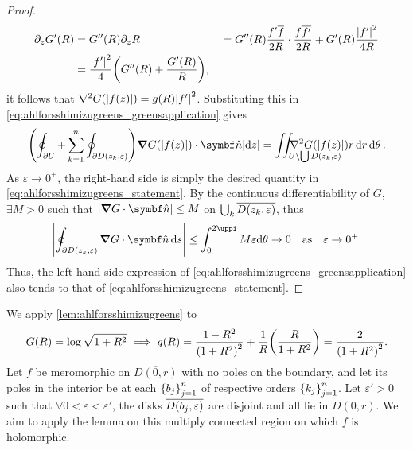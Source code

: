 \begin{proof}
\begin{align*}
        \partial_zG'(R)             & =G''(R)\partial_zR                               &                                             & =G''(R)\frac{f'\overline{f}}{2R}\cdot\frac{f\overline{f'}}{2R}+G'(R)\frac{\abs{f'}^2}{4R} \\
        & =\frac{\abs{f'}^2}4\qty(G''(R)+\frac{G'(R)}{R}),
    \end{align*}
    it follows that \(\laplacian{G\qty(\abs{f(z)})}=g(R)\abs{f'}^2\). Substituting this in \cref{eq:ahlforsshimizugreens_greensapplication} gives \[\qty(\oint_{\partial U}+\sum_{k=1}^n\oint_{\partial D\qty(z_k,\varepsilon)})\grad{G\qty(\abs{f(z)})}\cdot\vu{n}\abs{\ddz}=\mathop{\mathmakebox[\widthof{\(\iint\)}][l]{\iint_{U\setminus\bigcup D\qty(z_k,\varepsilon)}}}\laplacian{G\qty(\abs{f(z)})}r\dd{r}\dd{\theta}.\]
    As \(\varepsilon\to 0^+\), the right-hand side is simply the desired quantity in \cref{eq:ahlforsshimizugreens_statement}. By the continuous differentiability of \(G\), \(\exists M>0\) such that \(\abs{\grad{G}\cdot\vu{n}}\leq M\) on \(\textstyle\bigcup_k\overline{D\qty(z_k,\varepsilon)}\), thus
    \[\abs{\oint_{\partial D\qty(z_k,\varepsilon)}\grad{G}\cdot\vu{n}\dd{s}}\leq\int_0^{2\uppi}M\varepsilon\dd\theta\to 0\qq{as}\varepsilon\to 0^+.\]
    Thus, the left-hand side expression of \cref{eq:ahlforsshimizugreens_greensapplication} also tends to that of \cref{eq:ahlforsshimizugreens_statement}.
\end{proof}
We apply \cref{lem:ahlforsshimizugreens} to \[G(R)=\log\sqrt{1+R^2}\implies g(R)=\frac{1-R^2}{\qty(1+R^2)^2}+\frac1R\qty(\frac{R}{1+R^2})=\frac{2}{\qty(1+R^2)^2}.\]
Let \(f\) be meromorphic on \(\overline{D(0,r)}\) with no poles on the boundary, and let its poles in the interior be at each \(\qty{b_j}_{j=1}^n\) of respective orders \(\qty{k_j}_{j=1}^n\). Let \(\varepsilon'>0\) such that \(\forall 0<\varepsilon<\varepsilon'\), the disks \(\overline{D\qty(b_j,\varepsilon)}\) are disjoint and all lie in \(D(0,r)\). We aim to apply the lemma on this multiply connected region on which \(f\) is holomorphic.

